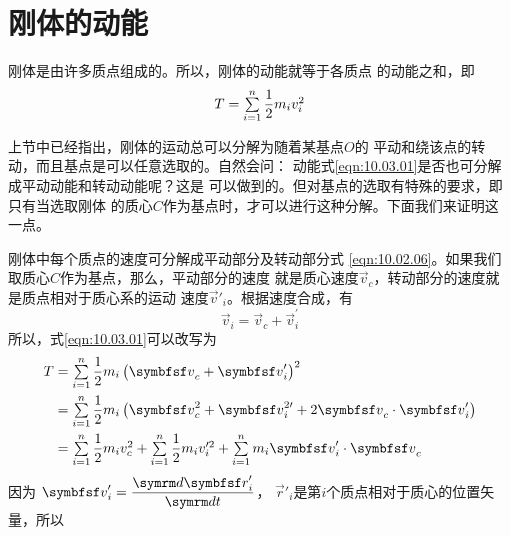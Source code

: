 \section{刚体的动能}\label{sec:10.03}

刚体是由许多质点组成的。所以，刚体的动能就等于各质点
的动能之和，即
\begin{equation}\label{eqn:10.03.01}
    T = \textstyle\sum\limits _ { i = 1 } ^ { n } \dfrac { 1 } { 2 } m _ i v _ i ^ { 2 }
\end{equation}

上节中已经指出，刚体的运动总可以分解为随着某基点$ O $的
平动和绕该点的转动，而且基点是可以任意选取的。自然会问：
动能\lhbrak 式\eqref{eqn:10.03.01}\rhbrak 是否也可分解成平动动能和转动动能呢？这是
可以做到的。但对基点的选取有特殊的要求，即只有当选取刚体
的质心$ C $作为基点时，才可以进行这种分解。下面我们来证明这
一点。

刚体中每个质点的速度可分解成平动部分及转动部分\lhbrak 式 \eqref{eqn:10.02.06}\rhbrak 。如果我们取质心$ C $作为基点，那么，平动部分的速度
就是质心速度$ \vec{v} _ c $，转动部分的速度就是质点相对于质心系的运动
速度$ \vec{v}' _i $。根据速度合成，有
\begin{equation*}
    \vec{v} _ { i } = \vec{v} _ { c } + \vec{v} _ { i } ^ { \prime }
\end{equation*}
所以，式\eqref{eqn:10.03.01}可以改写为
\begin{equation}\label{eqn:10.03.02}
    \begin{split}
                T &=\sumx_{i=1}^{n} \dfrac{1}{2} m_{i}\left(\vec{v}_{c}+\vec{v}_{i}^{\prime}\right)^{2} \\
                &=\sumx_{i=1}^{n} \dfrac{1}{2} m_{i}\left(\vec{v}_{c}^{2}+\vec{v}_{i}^{2 \prime}+2 \vec{v}_{c} \cdot \vec{v}_{i}^{\prime}\right) \\
                &=\sumx_{i=1}^{n} \dfrac{1}{2} m_{i} v_{c}^{2}+\sumx_{i=1}^{n} \dfrac{1}{2} m_{i} v_{i}^{\prime 2}+\sumx_{i=1}^{n} m_{i} \vec{v}_{i}^{\prime} \cdot \vec{v}_{c}
    \end{split}
\end{equation}
因为
$ \vec{v} _ i ^ { \prime } = \dfrac { \dif \vec{r}'_ i }  { \dif t }  $，
$ \vec{r}'_i $是第$ i $个质点相对于质心的位置矢量，所以

